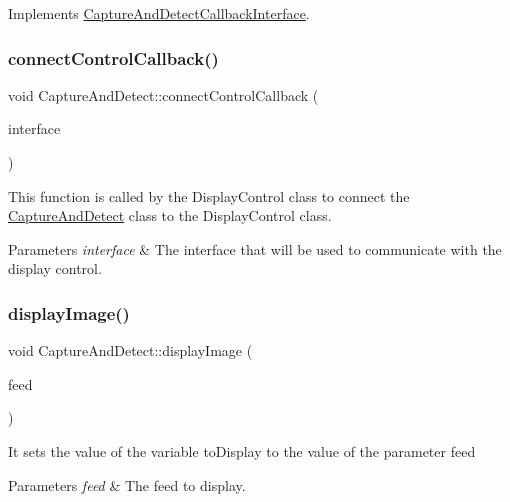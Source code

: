 Implements \hyperlink{classCaptureAndDetectCallbackInterface_a64755838dd5592bae3ca06b4c5a0d72f}{Capture\+And\+Detect\+Callback\+Interface}.

\mbox{\label{classCaptureAndDetect_aa75e3ba836797d18aa02c72bbf975082}} 
\subsubsection{\texorpdfstring{connect\+Control\+Callback()}{connectControlCallback()}}
{\footnotesize\ttfamily void Capture\+And\+Detect\+::connect\+Control\+Callback (\begin{DoxyParamCaption}\item[{Display\+Control\+Callback\+Interface $\ast$}]{interface }\end{DoxyParamCaption})}

This function is called by the Display\+Control class to connect the \hyperlink{classCaptureAndDetect}{Capture\+And\+Detect} class to the Display\+Control class.


\begin{DoxyParams}{Parameters}
{\em interface} & The interface that will be used to communicate with the display control. \\
\hline
\end{DoxyParams}
\mbox{\label{classCaptureAndDetect_a3f1ba69514a2debbc6b2a03e76f31b65}} 
\subsubsection{\texorpdfstring{display\+Image()}{displayImage()}}
{\footnotesize\ttfamily void Capture\+And\+Detect\+::display\+Image (\begin{DoxyParamCaption}\item[{int}]{feed }\end{DoxyParamCaption})}

It sets the value of the variable to\+Display to the value of the parameter feed


\begin{DoxyParams}{Parameters}
{\em feed} & The feed to display. \\
\hline
\end{DoxyParams}
\mbox{\label{classCaptureAndDetect_a485523d1c8231e2f744bf9d7fa110f88}} 
